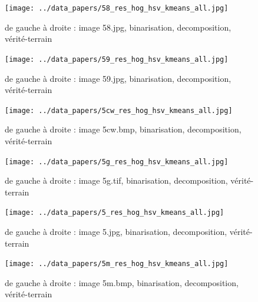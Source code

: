 \documentclass{book}
\begin{document}
\begin{figure}[H]
\begin{center}
\texttt{[image: ../data\_papers/58\_res\_hog\_hsv\_kmeans\_all.jpg]}
\end{center}
\caption{de gauche à droite : image 58.jpg, binarisation, decomposition, vérité-terrain}
\label{58}
\end{figure}
\clearpage


\begin{figure}[H]
\begin{center}
\texttt{[image: ../data\_papers/59\_res\_hog\_hsv\_kmeans\_all.jpg]}
\end{center}
\caption{de gauche à droite : image 59.jpg, binarisation, decomposition, vérité-terrain}
\label{59}
\end{figure}
\clearpage


\begin{figure}[H]
\begin{center}
\texttt{[image: ../data\_papers/5cw\_res\_hog\_hsv\_kmeans\_all.jpg]}
\end{center}
\caption{de gauche à droite : image 5cw.bmp, binarisation, decomposition, vérité-terrain}
\label{5cw}
\end{figure}
\clearpage


\begin{figure}[H]
\begin{center}
\texttt{[image: ../data\_papers/5g\_res\_hog\_hsv\_kmeans\_all.jpg]}
\end{center}
\caption{de gauche à droite : image 5g.tif, binarisation, decomposition, vérité-terrain}
\label{5g}
\end{figure}
\clearpage


\begin{figure}[H]
\begin{center}
\texttt{[image: ../data\_papers/5\_res\_hog\_hsv\_kmeans\_all.jpg]}
\end{center}
\caption{de gauche à droite : image 5.jpg, binarisation, decomposition, vérité-terrain}
\label{5}
\end{figure}
\clearpage


\begin{figure}[H]
\begin{center}
\texttt{[image: ../data\_papers/5m\_res\_hog\_hsv\_kmeans\_all.jpg]}
\end{center}
\caption{de gauche à droite : image 5m.bmp, binarisation, decomposition, vérité-terrain}
\label{5m}
\end{figure}
\clearpage
\end{document}
